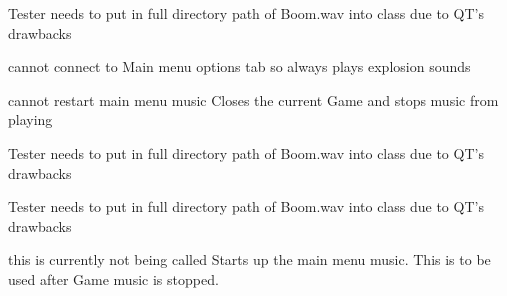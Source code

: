 
\begin{DoxyRefList}
\item[\label{bug__bug000001}%
\hypertarget{bug__bug000001}{}%
Member \hyperlink{class_bomb_a5752ce7daece5c3bf2e2178bcfcb820d}{Bomb\-:\-:explode} ()]Tester needs to put in full directory path of Boom.\-wav into class due to Q\-T's drawbacks 

cannot connect to Main menu options tab so always plays explosion sounds  
\item[\label{bug__bug000003}%
\hypertarget{bug__bug000003}{}%
Member \hyperlink{class_game_screen_af2a5d4c707d0d0f47201eec498b77bd6}{Game\-Screen\-:\-:close\-Event} (Q\-Close\-Event $\ast$)]cannot restart main menu music Closes the current Game and stops music from playing  
\item[\label{bug__bug000002}%
\hypertarget{bug__bug000002}{}%
Member \hyperlink{class_game_screen_a61ac084a564d45be53337cc364214a60}{Game\-Screen\-:\-:Game\-Screen} (Q\-Widget $\ast$parent=0)]Tester needs to put in full directory path of Boom.\-wav into class due to Q\-T's drawbacks  
\item[\label{bug__bug000004}%
\hypertarget{bug__bug000004}{}%
Member \hyperlink{class_info_screen_a334bc1b328e13d04889b2f166806de9e}{Info\-Screen\-:\-:Info\-Screen} (Q\-Widget $\ast$parent=0)]Tester needs to put in full directory path of Boom.\-wav into class due to Q\-T's drawbacks  
\item[\label{bug__bug000005}%
\hypertarget{bug__bug000005}{}%
Member \hyperlink{class_main_window_ab622d7f3b4082b8221185e216991e602}{Main\-Window\-:\-:play\-Again} ()]this is currently not being called Starts up the main menu music. This is to be used after Game music is stopped. 
\end{DoxyRefList}